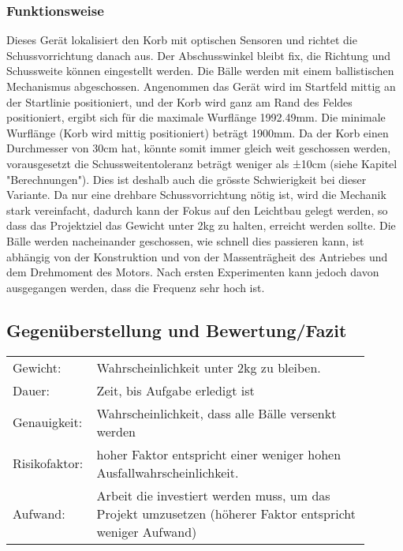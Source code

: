 \subsubsection{Funktionsweise}
Dieses Gerät lokalisiert den Korb mit optischen Sensoren und richtet die 
Schussvorrichtung danach aus. Der Abschusswinkel bleibt fix, die Richtung und 
Schussweite können eingestellt werden. Die Bälle werden mit einem 
ballistischen Mechanismus abgeschossen. Angenommen das Gerät wird im Startfeld 
mittig an der Startlinie positioniert, und der Korb wird ganz am Rand des 
Feldes positioniert, ergibt sich für die maximale Wurflänge 1992.49mm. Die 
minimale Wurflänge (Korb wird mittig positioniert) beträgt 1900mm. Da der Korb 
einen Durchmesser von 30cm hat, könnte somit immer gleich weit geschossen 
werden, vorausgesetzt die Schussweitentoleranz beträgt weniger als ±10cm 
(siehe Kapitel "Berechnungen"). Dies ist deshalb auch die grösste 
Schwierigkeit bei dieser Variante. Da nur eine drehbare Schussvorrichtung nötig 
ist, wird die Mechanik stark vereinfacht, dadurch kann der Fokus auf den 
Leichtbau gelegt werden, so dass das Projektziel das Gewicht unter 2kg zu 
halten, erreicht werden sollte. Die Bälle werden nacheinander geschossen, wie 
schnell dies passieren kann, ist abhängig von der Konstruktion und von der 
Massenträgheit des Antriebes und dem Drehmoment des Motors. Nach ersten 
Experimenten kann jedoch davon ausgegangen werden, dass die Frequenz sehr hoch 
ist.

\clearpage



\clearpage

\subsection{Gegenüberstellung und Bewertung/Fazit}
\begin{tabular}{@{}p{0.15\linewidth}p{0.75\linewidth}}
    Gewicht:        & Wahrscheinlichkeit unter 2kg zu bleiben. \\
    Dauer:          & Zeit, bis Aufgabe erledigt ist \\
    Genauigkeit:    & Wahrscheinlichkeit, dass alle Bälle versenkt werden \\
    Risikofaktor:   & hoher Faktor entspricht einer weniger hohen Ausfallwahrscheinlichkeit. \\
    Aufwand:        & Arbeit die investiert werden muss, um das Projekt umzusetzen (höherer Faktor entspricht weniger Aufwand) \\
\end{tabular}

